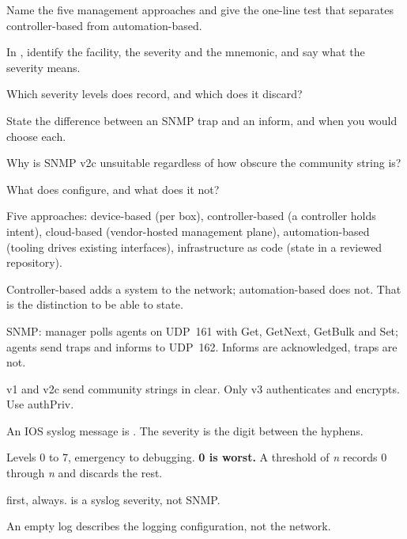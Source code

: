 \begin{checkpoint}
\begin{tightnum}
  \item Name the five management approaches and give the one-line test that
        separates controller-based from automation-based.
  \item In , identify the facility, the severity and the
        mnemonic, and say what the severity means.
  \item Which severity levels does  record, and
        which does it discard?
  \item State the difference between an SNMP trap and an inform, and when you
        would choose each.
  \item Why is SNMP v2c unsuitable regardless of how obscure the community string
        is?
  \item What does  configure, and what does it not?
\end{tightnum}
\end{checkpoint}

\begin{chaptersummary}
\begin{tight}
  \item Five approaches: device-based (per box), controller-based (a controller
        holds intent), cloud-based (vendor-hosted management plane),
        automation-based (tooling drives existing interfaces), infrastructure as
        code (state in a reviewed repository).
  \item Controller-based adds a system to the network; automation-based does not.
        That is the distinction to be able to state.
  \item SNMP: manager polls agents on UDP~161 with Get, GetNext, GetBulk and Set;
        agents send traps and informs to UDP~162. Informs are acknowledged, traps
        are not.
  \item v1 and v2c send community strings in clear. Only v3 authenticates and
        encrypts. Use authPriv.
  \item An IOS syslog message is
        . The severity is the
        digit between the hyphens.
  \item Levels 0 to 7, emergency to debugging. \textbf{0 is worst.} A threshold
        of \emph{n} records 0 through \emph{n} and discards the rest.
  \item {} first, always.  is a syslog
        severity, not SNMP.
  \item An empty log describes the logging configuration, not the network.
\end{tight}
\end{chaptersummary}

